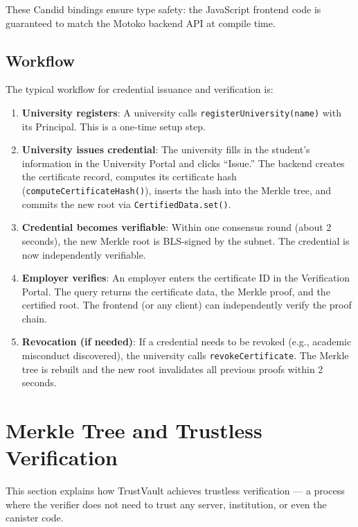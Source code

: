 \documentclass[journal]{IEEEtran}
\begin{document}
These Candid bindings ensure type safety: the JavaScript frontend code is guaranteed to match the Motoko backend API at compile time.

\subsection{Workflow}

The typical workflow for credential issuance and verification is:

\begin{enumerate}
  \item \textbf{University registers}: A university calls \texttt{registerUniversity(name)} with its Principal. This is a one-time setup step.
  \item \textbf{University issues credential}: The university fills in the student's information in the University Portal and clicks ``Issue.'' The backend creates the certificate record, computes its certificate hash (\texttt{computeCertificateHash()}), inserts the hash into the Merkle tree, and commits the new root via \texttt{CertifiedData.set()}.
  \item \textbf{Credential becomes verifiable}: Within one consensus round (about 2 seconds), the new Merkle root is BLS-signed by the subnet. The credential is now independently verifiable.
  \item \textbf{Employer verifies}: An employer enters the certificate ID in the Verification Portal. The query returns the certificate data, the Merkle proof, and the certified root. The frontend (or any client) can independently verify the proof chain.
  \item \textbf{Revocation (if needed)}: If a credential needs to be revoked (e.g., academic misconduct discovered), the university calls \texttt{revokeCertificate}. The Merkle tree is rebuilt and the new root invalidates all previous proofs within 2 seconds.
\end{enumerate}

\section{Merkle Tree and Trustless Verification}
\label{sec:merkle}

This section explains how TrustVault achieves trustless verification — a process where the verifier does not need to trust any server, institution, or even the canister code.
\end{document}

